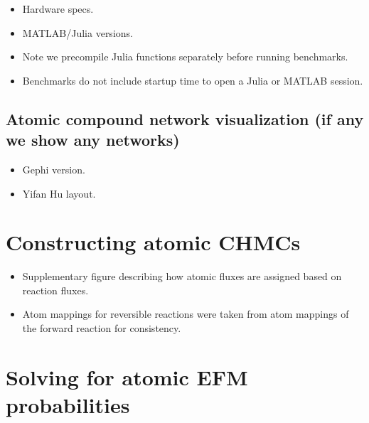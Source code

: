 \documentclass[11pt]{article}
\begin{document}
\begin{itemize}
    \item Hardware specs.
    \item MATLAB/Julia versions.
    \item Note we precompile Julia functions separately before running benchmarks.
    \item Benchmarks do not include startup time to open a Julia or MATLAB session.
\end{itemize}

\subsection{Atomic compound network visualization (if any we show any networks)}

\begin{itemize}
    \item Gephi version.
    \item Yifan Hu layout.
\end{itemize}


\section{Constructing atomic CHMCs}

\begin{itemize}
    \item Supplementary figure describing how atomic fluxes are assigned based on reaction fluxes.
    \item Atom mappings for reversible reactions were taken from atom mappings of the forward reaction for consistency.
\end{itemize}

\section{Solving for atomic EFM probabilities}
\end{document}
